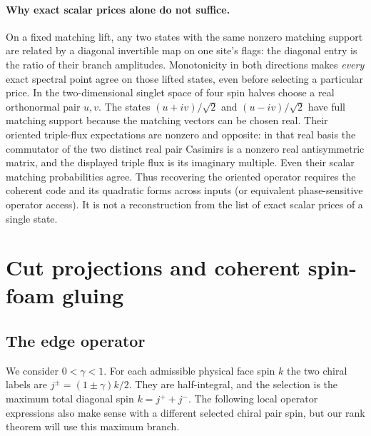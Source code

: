 \documentclass[11pt]{article}
\theoremstyle{remark}
\begin{document}
\paragraph{Why exact scalar prices alone do not suffice.}
On a fixed matching lift, any two states with the same nonzero matching support are related by a diagonal invertible map on one site's flags: the diagonal entry is the ratio of their branch amplitudes. Monotonicity in both directions makes \emph{every} exact spectral point agree on those lifted states, even before selecting a particular price. In the two-dimensional singlet space of four spin halves choose a real orthonormal pair \(u,v\). The states \((u+iv)/\sqrt 2\) and \((u-iv)/\sqrt 2\) have full matching support because the matching vectors can be chosen real. Their oriented triple-flux expectations are nonzero and opposite: in that real basis the commutator of the two distinct real pair Casimirs is a nonzero real antisymmetric matrix, and the displayed triple flux is its imaginary multiple. Even their scalar matching probabilities agree. Thus recovering the oriented operator requires the coherent code and its quadratic forms across inputs (or equivalent phase-sensitive operator access). It is not a reconstruction from the list of exact scalar prices of a single state.


\section{Cut projections and coherent spin-foam gluing}\label{sec:foam}

\subsection{The edge operator}

We consider \(0<\gamma<1\). For each admissible physical face spin \(k\) the two chiral labels are \(j^\pm=(1\pm\gamma)k/2\). They are half-integral, and the selection is the maximum total diagonal spin \(k=j^++j^-\). The following local operator expressions also make sense with a different selected chiral pair spin, but our rank theorem will use this maximum branch.
\end{document}
